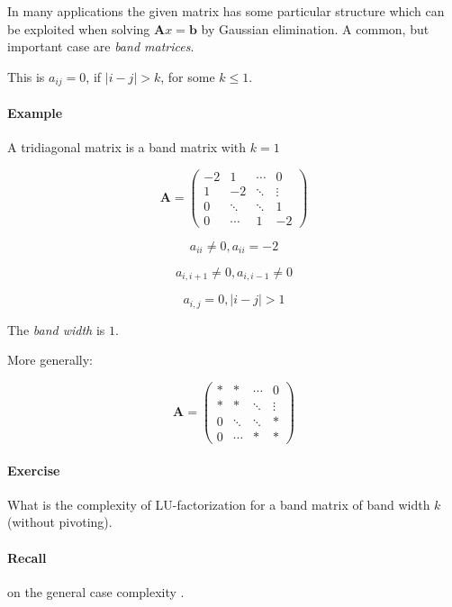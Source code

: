 In many applications the given matrix has some particular structure which can be
exploited when solving $\mathbf{A}x = \mathbf{b}$ by Gaussian elimination.
A common, but important case are \textit{band matrices}.

This is $a_{ij} = 0$, if $| i - j | > k$, for some $k \leq 1$.

\paragraph{Example} A tridiagonal matrix is a band matrix with $k = 1$

\[
	\mathbf{A} =
	\begin{pmatrix}
        -2 &      1 & \cdots & 0      \\
         1 &     -2 & \ddots & \vdots \\
         0 & \ddots & \ddots & 1      \\
         0 & \cdots & 1      & -2
	\end{pmatrix}
\]

\[
	a_{ii} \neq 0, a_{ii} = -2
\]

\[
	a_{i, i + 1} \neq 0, a_{i,i-1}  \neq 0
\]

\[
	a_{i,j} = 0, | i - j | > 1
\]


The \textit{band width} is $1$.

More generally:

\[
	\mathbf{A} =
	\begin{pmatrix}
        * &      * & \cdots & 0      \\
        * &      * & \ddots & \vdots \\
        0 & \ddots & \ddots & *      \\
        0 & \cdots & *      & *
	\end{pmatrix}
\]

\paragraph{Exercise} What is the complexity of LU-factorization for a band 
matrix of band width $k$ (without pivoting).

\paragraph{Recall} on the general case complexity .